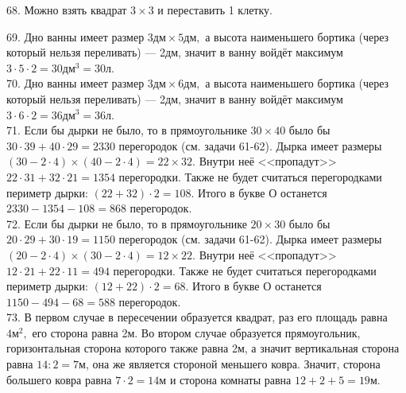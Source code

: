 \documentclass[12pt]{article}
\begin{document}
68. Можно взять квадрат $3\times3$ и переставить 1 клетку.
\begin{center}
\begin{figure}[ht!]
\end{figure}
\end{center}
69. Дно ванны имеет размер $3\text{дм}\times5\text{дм},$ а высота наименьшего бортика (через который нельзя переливать) --- 2дм, значит в ванну войдёт максимум $3\cdot5\cdot2=30\text{дм}^3=30$л.\\
70. Дно ванны имеет размер $3\text{дм}\times6\text{дм},$ а высота наименьшего бортика (через который нельзя переливать) --- 2дм, значит в ванну войдёт максимум $3\cdot6\cdot2=36\text{дм}^3=36$л.\\
71. Если бы дырки не было, то в прямоугольнике $30\times40$ было бы $30\cdot39+40\cdot29=2330$ перегородок (см. задачи 61-62). Дырка имеет размеры $(30-2\cdot4)\times(40-2\cdot4)=22\times32.$ Внутри неё <<пропадут>> $22\cdot31+32\cdot21=1354$ перегородки. Также не будет считаться перегородками периметр дырки: $(22+32)\cdot2=108.$ Итого в букве О останется $2330-1354-108=868$ перегородок.\\
72. Если бы дырки не было, то в прямоугольнике $20\times30$ было бы $20\cdot29+30\cdot19=1150$ перегородок (см. задачи 61-62). Дырка имеет размеры $(20-2\cdot4)\times(30-2\cdot4)=12\times22.$ Внутри неё <<пропадут>> $12\cdot21+22\cdot11=494$ перегородки. Также не будет считаться перегородками периметр дырки: $(12+22)\cdot2=68.$ Итого в букве О останется $1150-494-68=588$ перегородок.\\
73. В первом случае в пересечении образуется квадрат, раз его площадь равна $4\text{м}^2,$ его сторона равна 2м. Во втором случае образуется прямоугольник, горизонтальная сторона которого также равна 2м, а значит вертикальная сторона равна $14:2=7$м, она же является стороной меньшего ковра. Значит, сторона большего ковра равна $7\cdot2=14$м и сторона комнаты равна $12+2+5=19$м.
\end{document}
